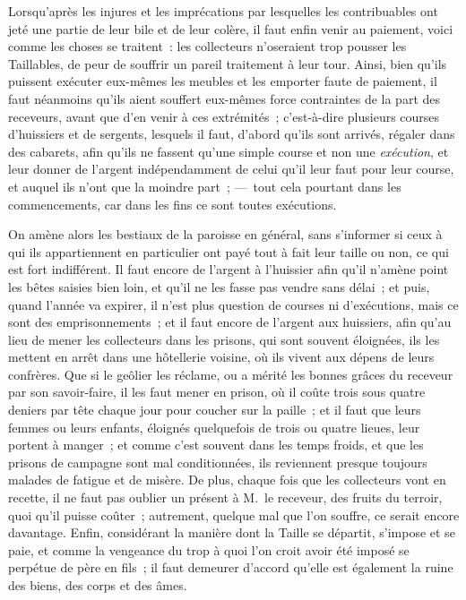 \documentclass[french,twoside]{book} %
\begin{document}
Lorsqu’après les injures et les imprécations par lesquelles les contribuables ont jeté une partie de leur bile et de leur colère, il faut enfin venir au paiement, voici comme les choses se traitent : les collecteurs n’oseraient trop pousser les Taillables, de peur de souffrir un pareil traitement à leur tour. Ainsi, bien qu’ils puissent exécuter eux-mêmes les meubles et les emporter faute de paiement, il faut néanmoins qu’ils aient souffert eux-mêmes force contraintes de la part des receveurs, avant que d’en venir à ces extrémités ; c’est-à-dire plusieurs courses d’huissiers et de sergents, lesquels il faut, d’abord qu’ils sont arrivés, régaler dans des cabarets, afin qu’ils ne fassent qu’une simple course et non une {\itshape exécution}, et leur donner de l’argent indépendamment de celui qu’il leur faut pour leur course, et auquel ils n’ont que la moindre part ; — tout cela pourtant dans les commencements, car dans les fins ce sont toutes exécutions.\par
On amène alors les bestiaux de la paroisse en général, sans s’informer si ceux à qui ils appartiennent en particulier ont payé tout à fait leur taille ou non, ce qui est fort indifférent. Il faut encore de l’argent à l’huissier afin qu’il n’amène point les bêtes saisies bien loin, et qu’il ne les fasse pas vendre sans délai ; et puis, quand l’année va expirer, il n’est plus question de courses ni d’exécutions, mais ce sont des emprisonnements ; et il faut encore de l’argent aux huissiers, afin qu’au lieu de mener les collecteurs dans les prisons, qui sont souvent éloignées, ils les mettent en arrêt dans une hôtellerie voisine, où ils vivent aux dépens de leurs confrères. Que si le geôlier les réclame, ou a mérité les bonnes grâces du receveur par son savoir-faire, il les faut mener en prison, où il coûte trois sous quatre deniers par tête chaque jour pour coucher sur la paille ; et il faut que leurs femmes ou leurs enfants, éloignés quelquefois de trois ou quatre lieues, leur portent à manger ; et comme c’est souvent dans les temps froids, et que les prisons de campagne sont mal conditionnées, ils reviennent presque toujours malades de fatigue et de misère. De plus, chaque fois que les collecteurs vont en recette, il ne faut pas oublier un présent à M. le receveur, des fruits du terroir, quoi qu’il puisse coûter ; autrement, quelque mal que l’on souffre, ce serait encore davantage. Enfin, considérant la manière dont la Taille se départit, s’impose et se paie, et comme la vengeance du trop à quoi l’on croit avoir été imposé se perpétue de père en fils ; il faut demeurer d’accord qu’elle est également la ruine des biens, des corps et des âmes.\par
\end{document}
